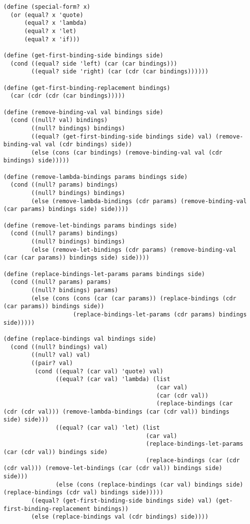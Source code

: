\documentclass[8pt]{article}
\begin{document}
\tiny
\begin{verbatim}
(define (special-form? x)
  (or (equal? x 'quote)
      (equal? x 'lambda)
      (equal? x 'let)
      (equal? x 'if)))

(define (get-first-binding-side bindings side)
  (cond ((equal? side 'left) (car (car bindings)))
        ((equal? side 'right) (car (cdr (car bindings))))))

(define (get-first-binding-replacement bindings)
  (car (cdr (cdr (car bindings)))))

(define (remove-binding-val val bindings side)
  (cond ((null? val) bindings)
        ((null? bindings) bindings)
        ((equal? (get-first-binding-side bindings side) val) (remove-binding-val val (cdr bindings) side))
        (else (cons (car bindings) (remove-binding-val val (cdr bindings) side)))))

(define (remove-lambda-bindings params bindings side)
  (cond ((null? params) bindings)
        ((null? bindings) bindings)
        (else (remove-lambda-bindings (cdr params) (remove-binding-val (car params) bindings side) side))))

(define (remove-let-bindings params bindings side)
  (cond ((null? params) bindings)
        ((null? bindings) bindings)
        (else (remove-let-bindings (cdr params) (remove-binding-val (car (car params)) bindings side) side))))

(define (replace-bindings-let-params params bindings side)
  (cond ((null? params) params)
        ((null? bindings) params)
        (else (cons (cons (car (car params)) (replace-bindings (cdr (car params)) bindings side))
                    (replace-bindings-let-params (cdr params) bindings side)))))

(define (replace-bindings val bindings side)
  (cond ((null? bindings) val)
        ((null? val) val)
        ((pair? val)
         (cond ((equal? (car val) 'quote) val)
               ((equal? (car val) 'lambda) (list
                                            (car val)
                                            (car (cdr val))
                                            (replace-bindings (car (cdr (cdr val))) (remove-lambda-bindings (car (cdr val)) bindings side) side)))
               ((equal? (car val) 'let) (list
                                         (car val)
                                         (replace-bindings-let-params (car (cdr val)) bindings side)
                                         (replace-bindings (car (cdr (cdr val))) (remove-let-bindings (car (cdr val)) bindings side) side)))
               (else (cons (replace-bindings (car val) bindings side) (replace-bindings (cdr val) bindings side)))))
        ((equal? (get-first-binding-side bindings side) val) (get-first-binding-replacement bindings))
        (else (replace-bindings val (cdr bindings) side))))


\end{verbatim}
\end{document}
